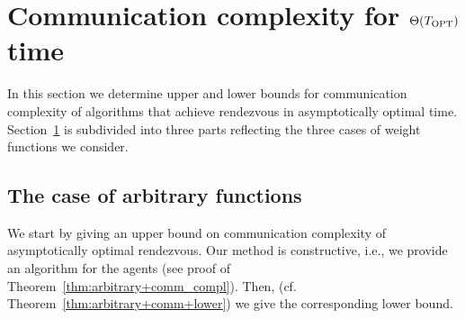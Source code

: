 \documentclass{llncs}
\newcommand{\Topts}{T_{\scriptsize \textup{OPT}}}
\begin{document}
\section{Communication complexity for $\Theta(\Topts)$ time} \label{sec:comm-compl}
In this section we determine upper and lower bounds for communication complexity of algorithms that achieve rendezvous in asymptotically optimal time.
Section~\ref{sec:comm-compl} is subdivided into three parts reflecting the three cases of weight functions we consider.

\subsection{The case of arbitrary functions}
We start by giving an upper bound on communication complexity of asymptotically optimal rendezvous.
Our method is constructive, i.e., we provide an algorithm for the agents (see proof of Theorem~\ref{thm:arbitrary+comm_compl}).
Then, (cf. Theorem~\ref{thm:arbitrary+comm+lower}) we give the corresponding lower bound.
\end{document}
